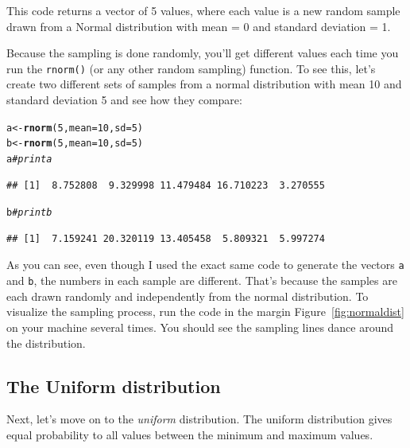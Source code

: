 \documentclass{tufte-book}\usepackage[]{graphicx}\usepackage[]{color}
\makeatletter
\newcommand{\hlnum}[1]{\textcolor[rgb]{0.686,0.059,0.569}{#1}}%
\newcommand{\hlcom}[1]{\textcolor[rgb]{0.678,0.584,0.686}{\textit{#1}}}%
\newcommand{\hlstd}[1]{\textcolor[rgb]{0.345,0.345,0.345}{#1}}%
\newcommand{\hlkwb}[1]{\textcolor[rgb]{0.69,0.353,0.396}{#1}}%
\newcommand{\hlkwc}[1]{\textcolor[rgb]{0.333,0.667,0.333}{#1}}%
\newcommand{\hlkwd}[1]{\textcolor[rgb]{0.737,0.353,0.396}{\textbf{#1}}}%
\newenvironment{kframe}{%
 \def\at@end@of@kframe{}%
 \ifinner\ifhmode%
  \def\at@end@of@kframe{\end{minipage}}%
  \begin{minipage}{\columnwidth}%
 \fi\fi%
 \def\FrameCommand##1{\hskip\@totalleftmargin \hskip-\fboxsep
 \colorbox{shadecolor}{##1}\hskip-\fboxsep
     \hskip-\linewidth \hskip-\@totalleftmargin \hskip\columnwidth}%
 \MakeFramed {\advance\hsize-\width
   \@totalleftmargin\z@ \linewidth\hsize
   \@setminipage}}%
 {\par\unskip\endMakeFramed%
 \at@end@of@kframe}
\newenvironment{knitrout}{}{} %
\makeatother
\begin{document}
This code returns a vector of 5 values, where each value is a new random sample drawn from a Normal distribution with mean = 0 and standard deviation = 1.

Because the sampling is done randomly, you'll get different values each time you run the \texttt{rnorm()} (or any other random sampling) function. To see this, let's create two different sets of samples from a normal distribution with mean 10 and standard deviation 5 and see how they compare:

\begin{knitrout}
\color{fgcolor}\begin{kframe}
\begin{alltt}
\hlstd{a} \hlkwb{<-} \hlkwd{rnorm}\hlstd{(}\hlnum{5}\hlstd{,} \hlkwc{mean} \hlstd{=} \hlnum{10}\hlstd{,} \hlkwc{sd} \hlstd{=} \hlnum{5}\hlstd{)}
\hlstd{b} \hlkwb{<-} \hlkwd{rnorm}\hlstd{(}\hlnum{5}\hlstd{,} \hlkwc{mean} \hlstd{=} \hlnum{10}\hlstd{,} \hlkwc{sd} \hlstd{=} \hlnum{5}\hlstd{)}
\hlstd{a} \hlcom{# print a}
\end{alltt}
\begin{verbatim}
## [1]  8.752808  9.329998 11.479484 16.710223  3.270555
\end{verbatim}
\begin{alltt}
\hlstd{b} \hlcom{# print b}
\end{alltt}
\begin{verbatim}
## [1]  7.159241 20.320119 13.405458  5.809321  5.997274
\end{verbatim}
\end{kframe}
\end{knitrout}


As you can see, even though I used the exact same code to generate the vectors \texttt{a} and \texttt{b}, the numbers in each sample are different. That's because the samples are each drawn randomly and independently from the normal distribution. To visualize the sampling process, run the code in the margin Figure~\ref{fig:normaldist} on your machine several times. You should see the sampling lines dance around the distribution. 

\subsection{The Uniform distribution}

Next, let's move on to the \textit{uniform} distribution. The uniform distribution gives equal probability to all values between the minimum and maximum values.
\end{document}
